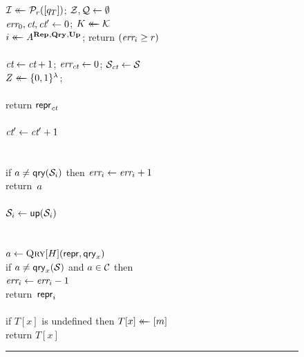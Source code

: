 \begin{figure}
  {
    \vspace{-7.5pt}
                  \hfill{}\;\\[2pt]
      $\mathcal{I} \mathrel{\leftarrow\mkern-14mu\leftarrow} \mathcal{P}_r([q_T])$;
      $\mathcal{Z}, \mathcal{Q} \gets \emptyset$\\
      $\textit{err}_0, \textit{ct}, \textit{ct}' \gets 0$;
      $K \mathrel{\leftarrow\mkern-14mu\leftarrow} \mathcal{K}$\\
      $i \mathrel{\leftarrow\mkern-14mu\leftarrow} \mathit{A}^{\mathbf{Rep}\hspace{0.5pt},\mathbf{Qry}\hspace{0.5pt},\mathbf{Up}\hspace{0.5pt}}$;
      return $(\textit{err}_i \ge r)$
    \\[6pt]
    \oraclev{$\REPO(\col)$}\\[2pt]
      $\textit{ct} \gets \textit{ct} + 1$; $\textit{err}_{\textit{ct}} \gets 0$;
      $\mathcal{S}_{\textit{ct}} \gets \mathcal{S}$\\
      $Z \mathrel{\leftarrow\mkern-14mu\leftarrow} \{0,1\}^\lambda$;
      \diffminus{$\pub_\ct \gets \Repx[F_\ky](\col, \salt)$}\\
      \diffplus{$\pub_\ct \gets \Repx[\Rnd](\col, \salt)$}\\
      return $\mathsf{repr}_{\textit{ct}}$
    \\[6pt]
    \\[2pt]
      $\textit{ct}' \gets \textit{ct}' + 1$\\
      \\
      \\
      if $a \neq \mathsf{qry}(\mathcal{S}_i)$ then $\textit{err}_i\gets\textit{err}_i+1$\\
      return~$a$
    \\[6pt]
    \\[2pt]
      $\mathcal{S}_i \gets \mathsf{up}(\mathcal{S}_i)$\\
      \\
      \\
      $a \gets \textsc{Qry}[H](\mathsf{repr}, \mathsf{qry}_x)$\\
      if $a \neq \mathsf{qry}_x(\mathcal{S})$ and $a \in \mathcal{C}$ then\\
      \tab $\textit{err}_i \gets \textit{err}_i-1$\\
      return~$\mathsf{repr}_i$
    \\[6pt]
    \\[2pt]
      if $T[x]$ is undefined then $T[x] \mathrel{\leftarrow\mkern-14mu\leftarrow} [m]$\\
      return $T[x]$
    \\
    \hspace*{-4pt}\rule{1.049\textwidth}{.4pt}
}
\end{figure}
